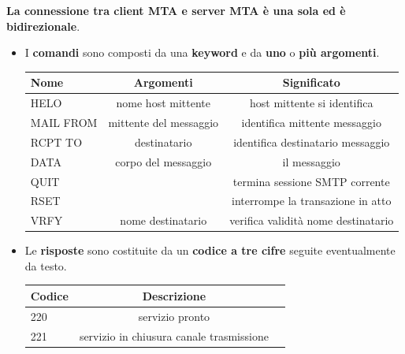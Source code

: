 \documentclass[11pt,a4paper]{article}
\theoremstyle{definition}
\begin{document}
\textbf{La connessione tra client MTA e server MTA è una sola ed è bidirezionale}.\newline
\begin{itemize}
	\item I \textbf{comandi} sono composti da una \textbf{keyword} e da \textbf{uno} o \textbf{più argomenti}.
	      \begin{table}[h!]
		      \begin{center}
			      \label{tab:table1}
			      \begin{tabular}{l|c|c}
				      \textbf{Nome} & \textbf{Argomenti}     & \textbf{Significato}                \\
				      \hline
				      HELO          & nome host mittente     & host mittente si identifica         \\
				      MAIL FROM     & mittente del messaggio & identifica mittente  messaggio      \\
				      RCPT TO       & destinatario           & identifica destinatario messaggio   \\
				      DATA          & corpo del messaggio    & il messaggio                        \\
				      QUIT          &                        & termina sessione SMTP
				      corrente                                                                     \\
				      RSET          &                        & interrompe la transazione in atto   \\
				      VRFY          & nome destinatario      & verifica validità nome destinatario \\
			      \end{tabular}
		      \end{center}
	      \end{table}
	\item Le \textbf{risposte} sono costituite da un \textbf{codice a tre cifre} seguite eventualmente da testo.
	      \begin{table}[h!]
		      \begin{center}
			      \label{tab:table1}
			      \begin{tabular}{l|c|c}
				      \textbf{Codice} & \textbf{Descrizione}                     \\
				      \hline
				      220             & servizio pronto                          \\
				      221             & servizio in chiusura canale trasmissione \\

\end{tabular}
\end{center}
\end{table}
\end{itemize}
\end{document}
